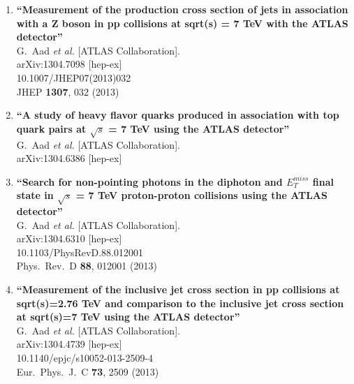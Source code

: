 \documentclass{article}
\begin{document}
\begin{enumerate}
\item%
{\bf ``Measurement of the production cross section of jets in association with a Z boson in pp collisions at sqrt(s) = 7 TeV with the ATLAS detector''}
  \\{}G.~Aad {\it et al.}  [ATLAS Collaboration].
  \\{}arXiv:1304.7098 [hep-ex]
    \\{}10.1007/JHEP07(2013)032
\\{}JHEP {\bf 1307}, 032 (2013) %


\item%
{\bf ``A study of heavy flavor quarks produced in association with top quark pairs at $\sqrt{s}$ = 7 TeV using the ATLAS detector''}
  \\{}G.~Aad {\it et al.}  [ATLAS Collaboration].
  \\{}arXiv:1304.6386 [hep-ex]
  


\item%
{\bf ``Search for non-pointing photons in the diphoton and $E_T^{miss}$ final state in $\sqrt{s}$ = 7 TeV proton-proton collisions using the ATLAS detector''}
  \\{}G.~Aad {\it et al.}  [ATLAS Collaboration].
  \\{}arXiv:1304.6310 [hep-ex]
    \\{}10.1103/PhysRevD.88.012001
\\{}Phys.\ Rev.\ D {\bf 88}, 012001 (2013) %


\item%
{\bf ``Measurement of the inclusive jet cross section in pp collisions at sqrt(s)=2.76 TeV and comparison to the inclusive jet cross section at sqrt(s)=7 TeV using the ATLAS detector''}
  \\{}G.~Aad {\it et al.}  [ATLAS Collaboration].
  \\{}arXiv:1304.4739 [hep-ex]
    \\{}10.1140/epjc/s10052-013-2509-4
\\{}Eur.\ Phys.\ J.\ C {\bf 73}, 2509 (2013) %



\end{enumerate}
\end{document}
